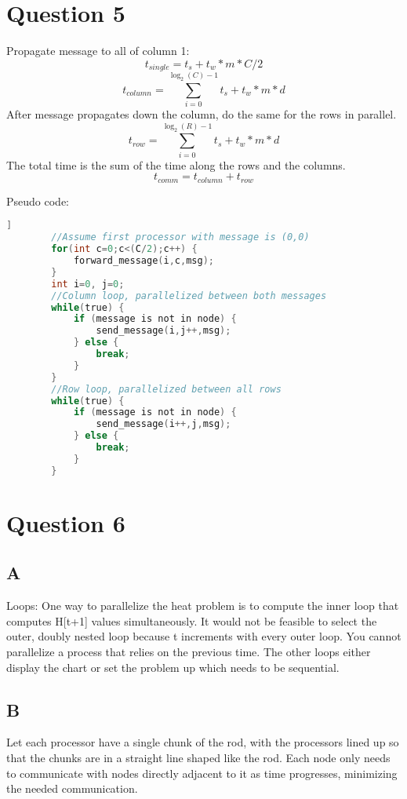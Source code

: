 \documentclass[12pt]{article}
\begin{document}
    \section{Question 5}
    Propagate message to all of column 1:
    \begin{displaymath}
        t_{single}=t_s+t_w*m*C/2
    \end{displaymath}
    \begin{displaymath}
        t_{column}=\sum_{i=0}^{\log_2(C)-1} t_s+t_w*m*d
    \end{displaymath}
    After message propagates down the column, do the same for the rows in parallel.
    \begin{displaymath}
        t_{row}=\sum_{i=0}^{\log_2(R)-1} t_s+t_w*m*d
    \end{displaymath}
    The total time is the sum of the time along the rows and the columns.
    \begin{displaymath}
        t_{comm}=t_{column}+t_{row}
    \end{displaymath}

    Pseudo code:
    \begin{lstlisting}[language=C]]
        //Assume first processor with message is (0,0)
        for(int c=0;c<(C/2);c++) {
            forward_message(i,c,msg);
        }
        int i=0, j=0;
        //Column loop, parallelized between both messages
        while(true) {
            if (message is not in node) {
                send_message(i,j++,msg);
            } else {
                break;
            }
        }
        //Row loop, parallelized between all rows
        while(true) {
            if (message is not in node) {
                send_message(i++,j,msg);
            } else {
                break;
            }
        }
    \end{lstlisting}
    \section{Question 6}
    \subsection*{A}
    Loops: One way to parallelize the heat problem is to compute the inner loop that computes H[t+1] values simultaneously. It would not be feasible to select the outer, doubly nested loop because t increments with every outer loop. You cannot parallelize a process that relies on the previous time. The other loops either display the chart or set the problem up which needs to be sequential.
    \subsection*{B}
    Let each processor have a single chunk of the rod, with the processors lined up so that the chunks are in a straight line shaped like the rod. Each node only needs to communicate with nodes directly adjacent to it as time progresses, minimizing the needed communication.
\end{document}
